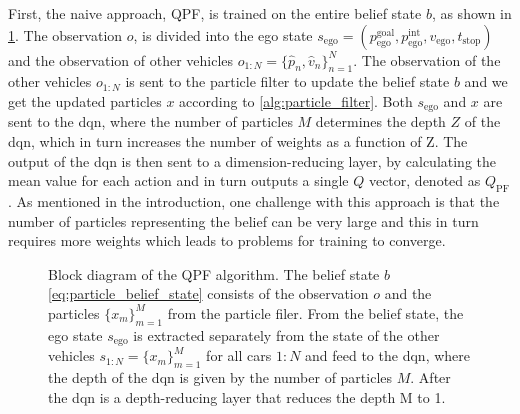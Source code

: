 First, the naive approach, QPF, is trained on the entire belief state $b$, as shown in \ref{fig:qpf}. The observation $o$, is divided into the ego state $s_\mathrm{ego}= (p_\mathrm{ego}^\mathrm{goal},p_\mathrm{ego}^\mathrm{int}, v_\mathrm{ego}, t_\mathrm{stop})$ and the observation of other vehicles $o_{1:N} = \{\hat p_n,\hat v_n \}_{n=1}^N$. The observation of the other vehicles $o_{1:N}$ is sent to the particle filter to update the belief state $b$ and we get the updated particles $x$ according to \ref{alg:particle_filter}. Both $s_\mathrm{ego}$ and $x$ are sent to the \gls{dqn}, where the number of particles $M$ determines the depth $Z$ of the \gls{dqn}, which in turn increases the number of weights as a function of Z. The output of the \gls{dqn} is then sent to a dimension-reducing layer, by calculating the mean value for each action and in turn outputs a single $Q$ vector, denoted as $Q_\mathrm{PF}$. 
As mentioned in the introduction, one challenge with this approach is that the number of particles representing the belief can be very large and this in turn requires more weights which leads to problems for training to converge. 
\begin{figure}[!h]
    \centering
        
        \caption{Block diagram of the QPF algorithm. 
        The belief state $b$ \eqref{eq:particle_belief_state} consists of the observation $o$ and the particles $\{ x_m \}^M_{m=1}$ from the particle filer. From the belief state, the ego state $s_\mathrm{ego}$ is extracted separately from the state of the other vehicles $s_{1:N}=\{ x_m \}^M_{m=1}$ for all cars $1:N$ and feed to the \gls{dqn}, where the depth of the \gls{dqn} is given by the number of particles $M$. After the \gls{dqn} is a depth-reducing layer that reduces the depth M to 1.}
    \label{fig:qpf}
\end{figure}

